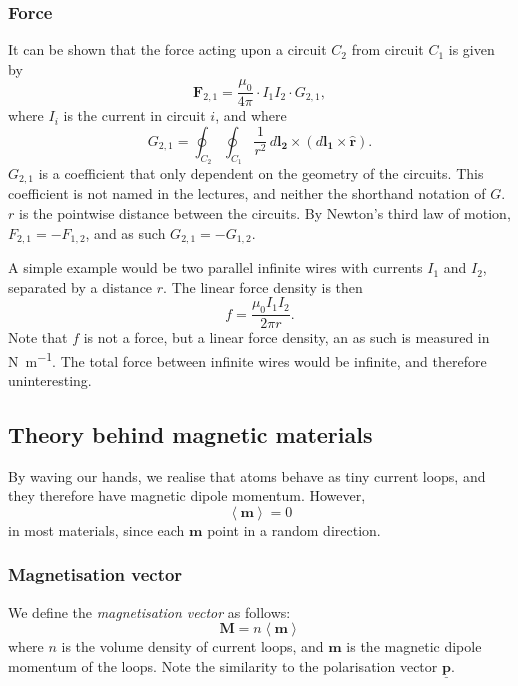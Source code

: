 \documentclass[a4paper, 12pt]{article}
\renewcommand{\vec}[1]{\mathbf{#1}}
\newcommand{\p}{\ensuremath{\vec{\underline{p}}}}
\let\tmp\hat
\renewcommand{\hat}[1]{\vec{\tmp{#1}}}
\begin{document}
        \subsubsection{Force}
            It can be shown that the force acting upon a circuit $C_2$ from circuit $C_1$ is given by
            \begin{equation}
                \vec{F}_{2,1} = \frac{\mu_0}{4\pi}\cdot I_1 I_2 \cdot G_{2,1},
            \end{equation}
            where $I_i$ is the current in circuit $i$, and where 
            \begin{equation}
                G_{2,1} = \oint_{C_2} \oint_{C_1} \frac{1}{r^2}\,d\vec{l_2}\times\left(d\vec{l_1} \times \hat{r}\right).
            \end{equation}
            $G_{2,1}$ is a coefficient that only dependent on the geometry of the circuits. 
            This coefficient is not named in the lectures, and neither the shorthand notation of $G$.
            $r$ is the pointwise distance between the circuits. By Newton's third law of motion, 
            $F_{2,1} = -F_{1,2}$, and as such $G_{2,1} = - G_{1,2}$.

            A simple example would be two parallel infinite wires with currents $I_1$ and $I_2$, 
            separated by a distance $r$. The linear force density is then
            \begin{equation}
                f = \frac{\mu_0 I_1 I_2}{2\pi r}.
            \end{equation}
            Note that $f$ is not a force, but a linear force density, an as such is measured in \si{\newton\per\metre}. 
            The total force between infinite wires would be infinite, and therefore uninteresting.

    \subsection{Theory behind magnetic materials}
        By waving our hands, we realise that atoms behave as tiny current loops, and they therefore have magnetic dipole momentum.
        However, 
        \begin{equation*}
            \left<\vec{m}\right> = 0
        \end{equation*}
        in most materials, since each $\vec{m}$ point in a random direction. 

        \subsubsection{Magnetisation vector}
            We define the \textit{magnetisation vector} as follows:
            \begin{equation}
                \vec{M} = n\left<\vec{m}\right>
            \end{equation}
            where $n$ is the volume density of current loops, and $\vec{m}$ is the magnetic dipole momentum of the loops. 
            Note the similarity to the polarisation vector $\p$.
\end{document}

